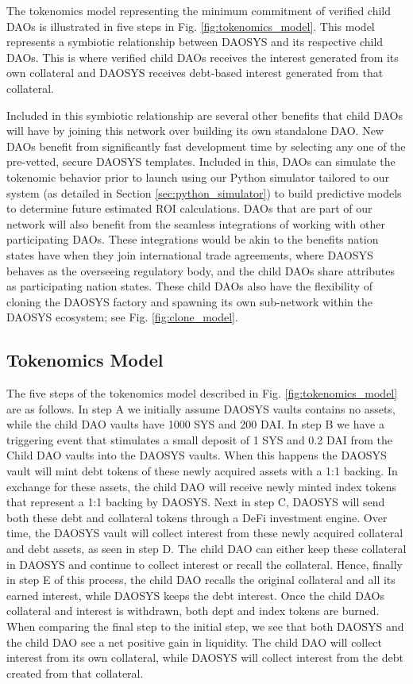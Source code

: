\documentclass[journal,twocolumn,12pt]{ieeesyscoin}
\begin{document}
The tokenomics model representing the minimum commitment of verified child DAOs is illustrated in five steps in Fig. \ref{fig:tokenomics_model}. This model represents a symbiotic relationship between DAOSYS and its respective child DAOs. This is where verified child DAOs receives the interest generated from its own collateral and DAOSYS receives debt-based interest generated from that collateral.

Included in this symbiotic relationship are several other benefits that child DAOs will have by joining this network over building its own standalone DAO. New DAOs benefit from significantly fast development time by selecting any one of the pre-vetted, secure DAOSYS templates. Included in this, DAOs can simulate the tokenomic behavior prior to launch using our Python simulator tailored to our system (as detailed in Section \ref{sec:python_simulator}) to build predictive models to determine future estimated ROI calculations. DAOs that are part of our network will also benefit from the seamless integrations of working with other participating DAOs. These integrations would be akin to the benefits nation states have when they join international trade agreements, where DAOSYS behaves as the overseeing regulatory body, and the child DAOs share attributes as participating nation states. These child DAOs also have the flexibility of cloning the DAOSYS factory and spawning its own sub-network within the DAOSYS ecosystem; see Fig. \ref{fig:clone_model}.  

\subsection{Tokenomics Model}
\label{sec:tokenomics_model}

The five steps of the tokenomics model described in Fig. \ref{fig:tokenomics_model} are as follows. In step A we initially assume DAOSYS vaults contains no assets, while the child DAO vaults have 1000 SYS and 200 DAI. In step B we have a triggering event that stimulates a small deposit of 1 SYS and 0.2 DAI from the Child DAO vaults into the DAOSYS vaults. When this happens the DAOSYS vault will mint debt tokens of these newly acquired assets with a 1:1 backing. In exchange for these assets, the child DAO will receive newly minted index tokens that represent a 1:1 backing by DAOSYS. Next in step C, DAOSYS will send both these debt and collateral tokens through a DeFi investment engine. Over time, the DAOSYS vault will collect interest from these newly acquired collateral and debt assets, as seen in step D. The child DAO can either keep these collateral in DAOSYS and continue to collect interest or recall the collateral. Hence, finally in step E of this process, the child DAO recalls the original collateral and all its earned interest, while DAOSYS keeps the debt interest. Once the child DAOs collateral and interest is withdrawn, both dept and index tokens are burned. When comparing the final step to the initial step, we see that both DAOSYS and the child DAO see a net positive gain in liquidity. The child DAO will collect interest from its own collateral, while DAOSYS will collect interest from the debt created from that collateral. 
\end{document}
